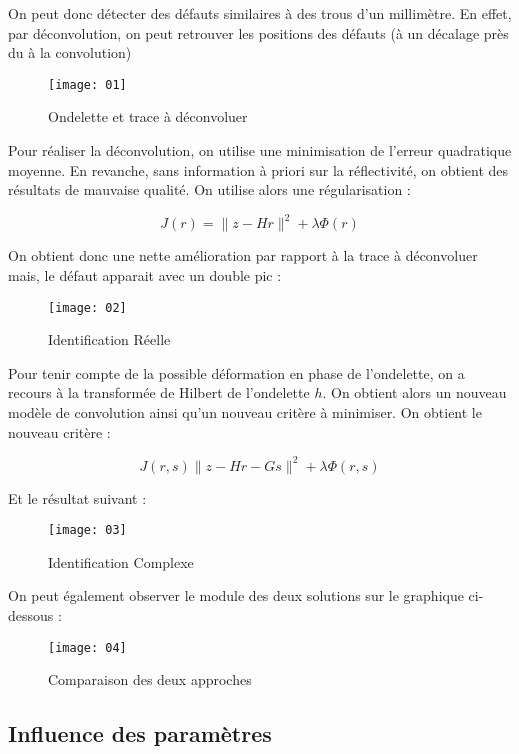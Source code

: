 \documentclass[12pt,a4paper,titlepage]{scrartcl}
\begin{document}
On peut donc détecter des défauts similaires à des trous d'un millimètre.
En effet, par déconvolution, on peut retrouver les positions des défauts
(à un décalage près du à la convolution)

\begin{figure}[H]
    \caption{Ondelette et trace à déconvoluer}
    \texttt{[image: 01]}
    \centering
\end{figure}

Pour réaliser la déconvolution, on utilise une minimisation de l'erreur
quadratique moyenne. En revanche, sans information à priori sur la
réflectivité, on obtient des résultats de mauvaise qualité. On utilise
alors une régularisation :

$$ J(r) = \lVert z - Hr \rVert^2 + \lambda \Phi(r) $$

On obtient donc une nette amélioration par rapport à la trace à déconvoluer mais,
le défaut apparait avec un double pic :

\begin{figure}[H]
    \caption{Identification Réelle}
    \texttt{[image: 02]}
    \centering
\end{figure}

Pour tenir compte de la possible déformation en phase de l'ondelette,
on a recours à la transformée de Hilbert de l'ondelette $h$. On obtient
alors un nouveau modèle de convolution ainsi qu'un nouveau critère
à minimiser. On obtient le nouveau critère :

$$ J(r,s) \lVert z - Hr - Gs \rVert^2 + \lambda \Phi(r,s) $$

Et le résultat suivant :

\begin{figure}[H]
    \caption{Identification Complexe}
    \texttt{[image: 03]}
    \centering
\end{figure}

On peut également observer le module des deux solutions sur le graphique
ci-dessous :

\begin{figure}[H]
    \caption{Comparaison des deux approches}
    \texttt{[image: 04]}
    \centering
\end{figure}

\subsection{Influence des paramètres}
\end{document}
